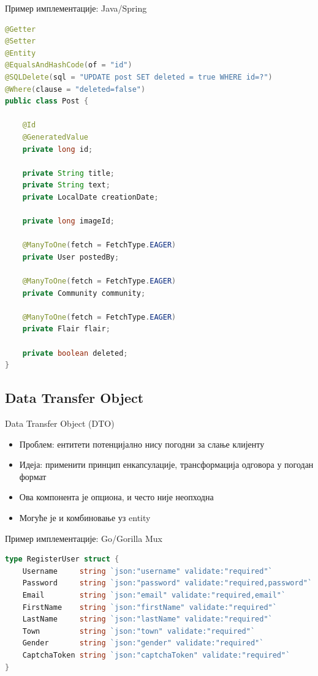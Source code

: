 \documentclass{beamer}
\begin{document}
    \begin{frame}[fragile]{Пример имплементације: Java/Spring}
        \begin{adjustbox}{width=\textwidth,height=\textheight,keepaspectratio}
			\begin{lstlisting}[language=java]
@Getter
@Setter
@Entity
@EqualsAndHashCode(of = "id")
@SQLDelete(sql = "UPDATE post SET deleted = true WHERE id=?")
@Where(clause = "deleted=false")
public class Post {

    @Id
    @GeneratedValue
    private long id;

    private String title;
    private String text;
    private LocalDate creationDate;

    private long imageId;

    @ManyToOne(fetch = FetchType.EAGER)
    private User postedBy;

    @ManyToOne(fetch = FetchType.EAGER)
    private Community community;

    @ManyToOne(fetch = FetchType.EAGER)
    private Flair flair;

    private boolean deleted;
}
			\end{lstlisting}
		\end{adjustbox}
    \end{frame}
    
    \subsection{Data Transfer Object}
    
    \begin{frame}{Data Transfer Object (DTO)}
        \begin{itemize}
			\item Проблем: ентитети потенцијално нису погодни за слање клијенту
			\item Идеја: применити принцип енкапсулације, трансформација одговора у погодан формат
			\item Ова компонента је опциона, и често није неопходна
			\item Могуће је и комбиновање уз entity
        \end{itemize}
    \end{frame}
    
            \begin{frame}[fragile]{Пример имплементације: Go/Gorilla Mux}
    	\begin{adjustbox}{width=\textwidth,height=\textheight,keepaspectratio}
			\begin{lstlisting}[language=go]
type RegisterUser struct {
	Username     string `json:"username" validate:"required"`
	Password     string `json:"password" validate:"required,password"`
	Email        string `json:"email" validate:"required,email"`
	FirstName    string `json:"firstName" validate:"required"`
	LastName     string `json:"lastName" validate:"required"`
	Town         string `json:"town" validate:"required"`
	Gender       string `json:"gender" validate:"required"`
	CaptchaToken string `json:"captchaToken" validate:"required"`
}
			\end{lstlisting}
		\end{adjustbox}
    \end{frame}
    
\end{document}
